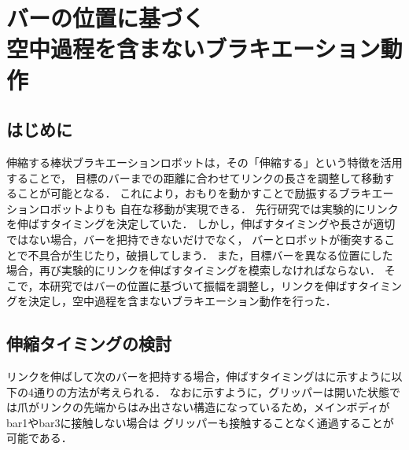 \chapter[バーの位置に基づく空中過程を含まないブラキエーション動作]%
{バーの位置に基づく\\空中過程を含まないブラキエーション動作}
        \section{はじめに}
        
        伸縮する棒状ブラキエーションロボットは，その「伸縮する」という特徴を活用することで，
        目標のバーまでの距離に合わせてリンクの長さを調整して移動することが可能となる．
        これにより，おもりを動かすことで励振するブラキエーションロボット\cite{akahane2022single}よりも
        自在な移動が実現できる．
        先行研究\cite{Hijiri:Robomech2024}では実験的にリンクを伸ばすタイミングを決定していた．
        しかし，伸ばすタイミングや長さが適切ではない場合，バーを把持できないだけでなく，
        バーとロボットが衝突することで不具合が生じたり，破損してしまう．
        また，目標バーを異なる位置にした場合，再び実験的にリンクを伸ばすタイミングを模索しなければならない．
        そこで，本研究ではバーの位置に基づいて振幅を調整し，リンクを伸ばすタイミングを決定し，空中過程を含まないブラキエーション動作を行った．
          
        \section{伸縮タイミングの検討}

        リンクを伸ばして次のバーを把持する場合，伸ばすタイミングはに示すように以下の4通りの方法が考えられる．
        なおに示すように，グリッパーは開いた状態では爪がリンクの先端からはみ出さない構造になっているため，メインボディがbar1やbar3に接触しない場合は
        グリッパーも接触することなく通過することが可能である．

